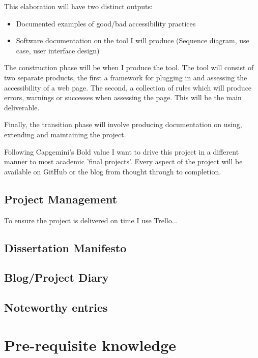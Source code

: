This elaboration will have two distinct outputs:
\begin{itemize}
  \item Documented examples of good/bad accessibility practices
  \item Software documentation on the tool I will produce (Sequence diagram, use case, user interface design)
\end{itemize}

The construction phase will be when I produce the tool. The tool will consist of two separate products, the first a framework for plugging
in and assessing the accessibility of a web page. The second, a collection of rules which will produce errors, warnings or successes when
assessing the page. This will be the main deliverable.

Finally, the transition phase will involve producing documentation on using, extending and maintaining the project.

Following Capgemini's Bold value I want to drive this project in a different manner to most academic 'final projects'. Every aspect of the
project will be available on GitHub or the blog from thought through to completion.

\subsection{Project Management}
To ensure the project is delivered on time I use Trello...

\subsection{Dissertation Manifesto}

\subsection{Blog/Project Diary}

\subsection{Noteworthy entries}

\section{Pre-requisite knowledge}
